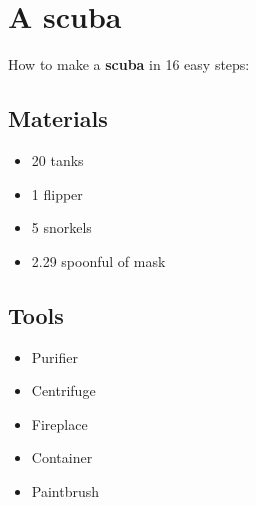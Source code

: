 \documentclass{article}
\begin{document}
\section{A scuba}How to make a \textbf{scuba} in 16 easy steps:

\subsection{Materials}\begin{itemize}
\item 
20 tanks
\item 
1 flipper
\item 
5 snorkels
\item 
2.29 spoonful of mask
\end{itemize}
\subsection{Tools}\begin{itemize}
\item 
Purifier
\item 
Centrifuge
\item 
Fireplace
\item 
Container
\item 
Paintbrush
\end{itemize}
\end{document}
